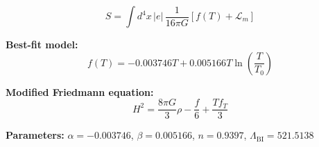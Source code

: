 
\begin{equation}
  S = \int d^4x \, |e| \, \frac{1}{16\pi G} \left[ f(T) + \mathcal{L}_m \right]
\end{equation}

\textbf{Best-fit model:}
\begin{equation}
  f(T) = -0.003746 T + 0.005166 T \ln\!\left(\frac{T}{T_0}\right)
\end{equation}

\textbf{Modified Friedmann equation:}
\begin{equation}
  H^2 = \frac{8\pi G}{3} \rho - \frac{f}{6} + \frac{T f_T}{3}
\end{equation}

\textbf{Parameters:}
$\alpha = -0.003746$, \quad
$\beta = 0.005166$, \quad
$n = 0.9397$, \quad
$\Lambda_{\text{BI}} = 521.5138$